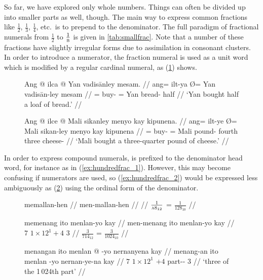 So far, we have explored only whole numbers. Things can often be divided up
into smaller parts as well, though. The main way to express common fractions
like $\frac{1}{2}$, $\frac{1}{3}$, $\frac{1}{4}$, etc.\ is to prepend
 to the denominator. The full paradigm of fractional
numerals from $\frac{1}{2}$ to $\frac{1}{\textsc{b}}$ is given in
\autoref{tab:smallfrac}. Note that a number of these fractions have slightly
irregular forms due to assimilation in consonant clusters. In order to
introduce a numerator, the fraction numeral is used as a unit word which is
modified by a regular cardinal numeral, as (\ref{ex:simplefrac}) shows.

\begin{figure}[h]
\pex\label{ex:simplefrac}
\a\begingl
	\gla Ang @ ilca {} @ Yan vadisānley mesam. //
	\glb ang= ilt-ya Ø= Yan vadisān-ley mesam //
	\glc \AgtT{}= buy-\TsgM{} \Top{}= Yan bread-\PargI{} half //
	\glft `Yan bought half a loaf of bread.' //
\endgl

\a\begingl
	\gla Ang @ ilce {} @ Mali sikanley menyo kay kipunena. //
	\glb ang= ilt-ye Ø= Mali sikan-ley menyo kay kipunena //
	\glc \AgtT{}= buy-\TsgM{} \Top{}= Mali pound-\PargI{} fourth three
		cheese-\Gen{} //
	\glft `Mali bought a three-quarter pound of cheese.' //
\endgl
\xe
\end{figure}

In order to express compound numerals,  is prefixed to the
denominator head word, for instance as in (\ref{ex:hundredfrac_1}). However,
this may become confusing if numerators are used, so (\ref{ex:hundredfrac_2})
would be expressed less ambiguously as (\ref{ex:hundredfrac_3}) using the
ordinal form of the denominator.

\begin{figure}[h]
\pex
\a\label{ex:hundredfrac_1}\begingl
	\gla memallan-hen //
	\glb men-mallan-hen //
	 //
	\glft $\frac{1}{\textsc{a}8_{12}}$ = $\frac{1}{128_{10}}$ //
\endgl

\a\label{ex:hundredfrac_2}\ljudge\ques\begingl
	\gla memenang ito menlan-yo kay //
	\glb men-menang ito menlan-yo kay //
	 {$7$} {$1 \times 12^1 + 4$} {$3$} //
	\glft $\frac{3}{714_{12}}$ = $\frac{3}{1024_{10}}$ //
\endgl

\a\label{ex:hundredfrac_3}\begingl
	\gla menangan ito menlan @ -yo nernanyena kay //
	\glb menang-an ito menlan -yo nernan-ye-na kay //
	 {$7$} {$1 \times 12^1$} {$+4$} part-\Pl{}-\Gen{} 
		$3$ //
	\glft `three of the 1\,024th part' //
\endgl
\xe
\end{figure}

